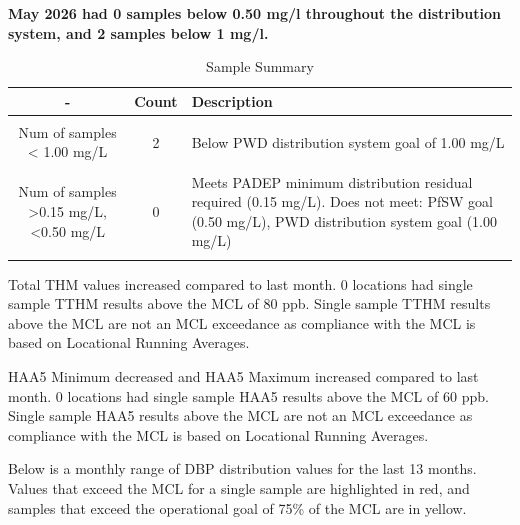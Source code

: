 \documentclass[
]{article}
\begin{document}
\textbf{May 2026 had 0 samples below 0.50 mg/l throughout the
distribution system, and 2 samples below 1 mg/l.}

\begin{table}[H]
\centering
\caption{\label{tab:unnamed-chunk-12}Sample Summary}
\centering
\begin{tabular}[t]{cc>{\centering\arraybackslash}p{20em}}
\toprule
- & Count & Description\\
\midrule
\cellcolor{gray!10}{Total DRR Samples for May 2026} & \cellcolor{gray!10}{488} & \cellcolor{gray!10}{}\\
Num of samples < 1.00 mg/L & 2 & Below PWD distribution system goal of 1.00 mg/L\\
\cellcolor{gray!10}{Num of samples >0.5 mg/L, <1.00 mg/L} & \cellcolor{gray!10}{2} & \cellcolor{gray!10}{Meets PfSW goal of 0.50 mg/L. Does not meet PWD distribution system goal 1.00 mg/L}\\
Num of samples >0.15 mg/L, <0.50 mg/L & 0 & Meets PADEP minimum distribution residual required (0.15 mg/L). Does not meet: PfSW goal (0.50 mg/L), PWD distribution system goal (1.00 mg/L)\\
\cellcolor{gray!10}{Num of samples <0.15 mg/L} & \cellcolor{gray!10}{0} & \cellcolor{gray!10}{Does not meet: PADEP minimum distribution residual required (0.15 mg/L), PfSW goal (0.50 mg/L), PWD distribution system goal (1.00 mg/L)}\\
\bottomrule
\end{tabular}
\end{table}

Total THM values increased compared to last month. 0 locations had
single sample TTHM results above the MCL of 80 ppb. Single sample TTHM
results above the MCL are not an MCL exceedance as compliance with the
MCL is based on Locational Running Averages.

HAA5 Minimum decreased and HAA5 Maximum increased compared to last
month. 0 locations had single sample HAA5 results above the MCL of 60
ppb. Single sample HAA5 results above the MCL are not an MCL exceedance
as compliance with the MCL is based on Locational Running Averages.

Below is a monthly range of DBP distribution values for the last 13
months. Values that exceed the MCL for a single sample are highlighted
in red, and samples that exceed the operational goal of 75\% of the MCL
are in yellow.
\end{document}
